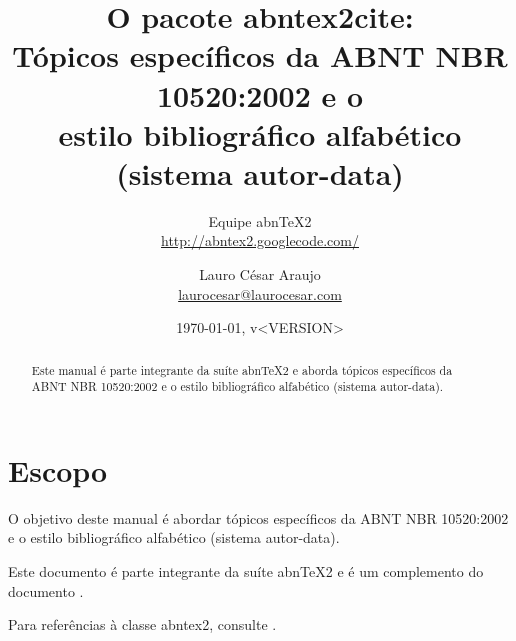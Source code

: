 \documentclass[a4paper]{ltxdoc}
\begin{document}
\nocite{santos1994}
\nocite{secretaria1999} %
\nocite{redes1995}
\nocite{makau1962} %

\newcommand{\titulo}{\textbf{O pacote \textsf{abntex2cite}}:\\ \Large{Tópicos
específicos da ABNT NBR 10520:2002 e o \\ estilo bibliográfico alfabético
(sistema autor-data)}}

\newcommand{\abnTeX}{abn\TeX}
\newcommand{\abnTeXSite}{\url{http://abntex2.googlecode.com/}}

\title{\titulo}
\author{Equipe \abnTeX2\\\abnTeXSite 
\and 
Lauro César Araujo\\\url{laurocesar@laurocesar.com}}
\date{\today, v<VERSION>}

\maketitle


\begin{abstract}
Este manual é parte integrante da suíte \abnTeX2 e aborda tópicos específicos
da ABNT NBR 10520:2002 e o estilo bibliográfico alfabético (sistema
autor-data).
\end{abstract}


\tableofcontents

\listoftables

\section{Escopo}

O objetivo deste manual é abordar tópicos específicos da ABNT NBR 10520:2002 e
o estilo bibliográfico alfabético (sistema autor-data). 

Este documento é parte integrante da suíte \abnTeX2 e é um complemento do
documento .

Para referências à classe \textsf{abntex2}, consulte .
\end{document}
